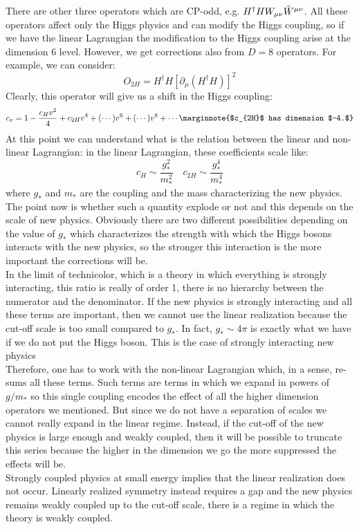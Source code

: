 \documentclass[../main.tex]{subfiles}
\begin{document}
There are other three operators which are CP-odd, e.g. $H^\dagger HW_{\mu\nu}\Tilde{W}^{\mu\nu}$. All these operators affect only the Higgs physics and can modify the Higgs coupling, so if we have the linear Lagrangian the modification to the Higgs coupling arise at the dimension 6 level. However, we get corrections also from $D=8$ operators. For example, we can consider:
\[
O_{2H}=H^\dagger H[\partial_\mu(H^\dagger H)]^2
\]
Clearly, this operator will give us a shift in the Higgs coupling:
\[
c_v=1-\frac{c_Hv^2}{4}+c_{2H}v^4+(\cdots)v^6+(\cdots)v^8+\cdots\marginnote{$c_{2H}$ has dimension $-4.$} 
\]
At this point we can understand what is the relation between the linear and non-linear Lagrangian: in the linear Lagrangian, these coefficients scale like:
\[
c_H\sim\frac{g_*^2}{m_*^2} \quad c_{2H}\sim\frac{g_*^4}{m_*^4}
\]
where $g_*$ and $m_*$ are the coupling and the mass characterizing the new physics.\\
The point now is whether such a quantity explode or not and this depends on the scale of new physics. Obviously there are two different possibilities depending on the value of $g_*$ which characterizes the strength with which the Higgs bosons interacts with the new physics, so the stronger this interaction is the more important the corrections will be.\\
In the limit of technicolor, which is a theory in which everything is strongly interacting, this ratio is really of order 1, there is no hierarchy between the numerator and the denominator. If the new physics is strongly interacting and all these terms are important, then we cannot use the linear realization because the cut-off scale is too small compared to $g_*$. In fact, $g_*\sim4\pi$ is exactly what we have if we do not put the Higgs boson. This is the case of strongly interacting new physics\\
Therefore, one has to work with the non-linear Lagrangian which, in a sense, re-sums all these terms. Such terms are terms in which we expand in powers of $g/m_*$ so this single coupling encodes the effect of all the higher dimension operators we mentioned. But since we do not have a separation of scales we cannot really expand in the linear regime. Instead, if the cut-off of the new physics is large enough and weakly coupled, then it will be possible to truncate this series because the higher in the dimension we go the more suppressed the effects will be.\\
Strongly coupled physics at small energy implies that the linear realization does not occur. Linearly realized symmetry instead requires a gap and the new physics remains weakly coupled up to the cut-off scale, there is a regime in which the theory is weakly coupled.\\
\end{document}
